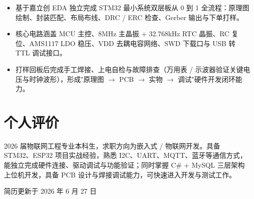 \documentclass[10pt,a4paper]{article}
\begin{document}
\begin{itemize}[leftmargin=1.5em, itemsep=2pt, parsep=0pt, topsep=2pt]
    \item 基于嘉立创 EDA 独立完成 STM32 最小系统双层板从 0 到 1 全流程：原理图绘制、封装匹配、布局布线、DRC / ERC 检查、Gerber 输出与下单打样。
    \item 核心电路涵盖 MCU 主控、8MHz 主晶振 + 32.768kHz RTC 晶振、RC 复位、AMS1117 LDO 稳压、VDD 去耦电容网络、SWD 下载口与 USB 转 TTL 调试接口。
    \item 打样回板后完成手工焊接、上电自检与故障排查（万用表 / 示波器验证关键电压与时钟波形），形成"原理图 $\to$ PCB $\to$ 实物 $\to$ 调试"硬件开发闭环能力。
\end{itemize}

\vspace{0.15em}

\section{\faUser\hspace{0.4em}个人评价}

2026 届物联网工程专业本科生，求职方向为嵌入式 / 物联网开发。具备 STM32、ESP32 项目实战经验，熟悉 I2C、UART、MQTT、蓝牙等通信方式，能独立完成硬件连接、驱动调试与功能验证；同时掌握 C\# + MySQL 三层架构上位机开发，具备 PCB 设计与焊接调试能力，可快速进入开发与测试工作。

\vfill
\begin{center}
{\color{graytext}\fontsize{7}{9}\selectfont 简历更新于 2026 年 6 月 27 日}
\end{center}
\end{document}
